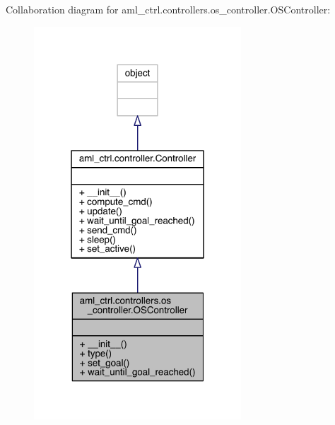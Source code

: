 Collaboration diagram for aml\+\_\+ctrl.\+controllers.\+os\+\_\+controller.\+O\+S\+Controller\+:\nopagebreak
\begin{figure}[H]
\begin{center}
\leavevmode
\includegraphics[width=220pt]{classaml__ctrl_1_1controllers_1_1os__controller_1_1_o_s_controller__coll__graph}
\end{center}
\end{figure}
